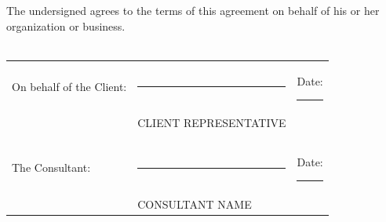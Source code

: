 \documentclass[10pt]{article}
\begin{document}
\vspace{1cm} 

\noindent The undersigned agrees to the terms of this agreement on behalf of his or
her organization or business.\\\\

\noindent \begin{tabular}{l l l}
On behalf of the Client: & \rule{6cm}{.2pt} & Date: \rule{2.4cm}{.2pt}\\
                         & CLIENT REPRESENTATIVE      & \\\\\\
The Consultant:          & \rule{6cm}{.2pt} & Date: \rule{2.4cm}{.2pt}\\
                         & CONSULTANT NAME      & \\
\end{tabular}
\end{document}
